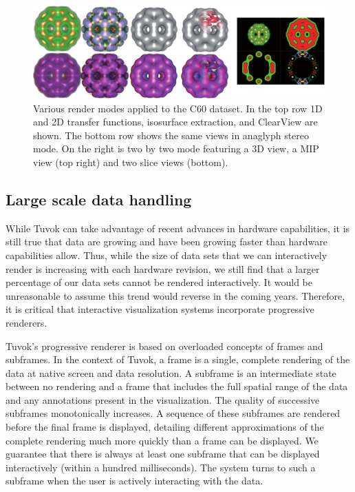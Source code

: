 \begin{figure}
	\includegraphics[width=\linewidth]{images/arch/c60modes}

  \caption{Various render modes applied to the C60 dataset.  In the
  top row 1D and 2D transfer functions, isosurface extraction, and
  ClearView are shown.  The bottom row shows the same views in anaglyph
  stereo mode.  On the right is two by two mode featuring a 3D view, a
  MIP view (top right) and two slice views (bottom).}
	\label{figtvk:modes}

\end{figure}

\subsection{Large scale data handling}
\label{sec:tvk-data}

While Tuvok can take advantage of recent advances in hardware
capabilities, it is still true that data are growing and have been
growing faster than hardware capabilities allow. Thus, while the size
of data sets that we can interactively render is increasing with each
hardware revision, we still find that a larger percentage of our data
sets cannot be rendered interactively.  It would be unreasonable to
assume this trend would reverse in the coming years. Therefore, it is
critical that interactive visualization systems incorporate progressive
renderers.

Tuvok's progressive renderer is based on overloaded concepts of frames
and subframes. In the context of Tuvok, a frame is a single, complete
rendering of the data at native screen and data resolution. A subframe
is an intermediate state between no rendering and a frame that includes
the full spatial range of the data and any annotations present in
the visualization. The quality of successive subframes monotonically
increases. A sequence of these subframes are rendered before the final
frame is displayed, detailing different approximations of the complete
rendering much more quickly than a frame can be displayed. We guarantee
that there is always at least one subframe that can be displayed
interactively (within a hundred milliseconds). The system turns to such
a subframe when the user is actively interacting with the data.


